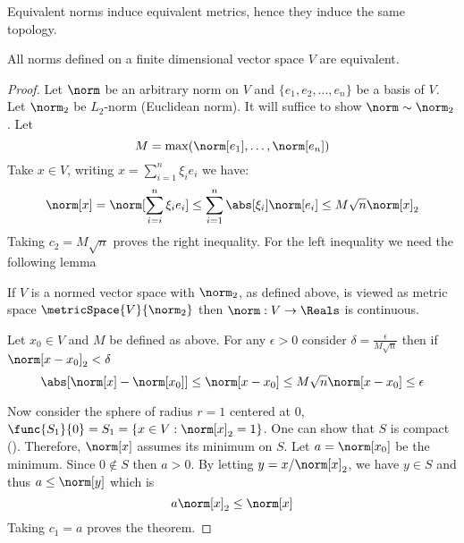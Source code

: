 \begin{remark}
    Equivalent norms induce equivalent metrics, hence they induce the same topology.
\end{remark}

\begin{theorem} \label{th:normsEquivalent}
    All norms defined on a finite dimensional vector space \(V\) are equivalent.
\end{theorem}

\begin{proof}
    Let \(\norm\) be an arbitrary norm on \(V\) and \(\{e_1, e_2, \dots , e_n\} \) be a basis of \(V\). Let \(\norm_2\) be \(L_2\)-norm (Euclidean norm). It will suffice to show \(\norm \sim \norm_2\). Let
    \begin{equation*}
        M = \max \! \left( \norm[e_1], \dots , \norm[e_n] \right)
    \end{equation*}
    Take \(x \in V\), writing \(x = \sum_{i = 1}^n {\xi_i e_i}\) we have:
    \begin{equation*}
        \norm[x] = \norm[\sum_{i = i}^n {\xi_i e_i}] \leq \sum_{i = 1}^n \abs[\xi_i] \norm[e_i] \leq M \sqrt{n} \norm[x]_2
    \end{equation*}
    Taking \(c_2 = M \sqrt{n}\) proves the right inequality. For the left inequality we need the following lemma
    \begin{lemma} \label{lm:ContinuityOfNorm}
        If \(V\) is a normed vector space with \(\norm_2\), as defined above, is viewed as metric space \(\metricSpace{V}{\norm_2}\) then \(\norm : V \to \Reals\) is continuous.
    \end{lemma}

    \begin{prooflemma}
        Let \(x_0 \in V\) and \(M\) be defined as above. For any \(\epsilon > 0\) consider \(\delta = \frac{\epsilon}{M \sqrt{n}}\) then if \(\norm[x - x_0]_2 < \delta\)
        \begin{equation*}
            \abs[{\norm[x] - \norm[x_0]}] \leq \norm[x - x_0] \leq M \sqrt{n} \norm[x - x_0] \leq \epsilon
        \end{equation*}
    \end{prooflemma}

    Now consider the sphere of radius \(r = 1\) centered at \(0\), \(\func{S_1}{0} = S_1 = \{x \in V : \norm[x]_2 = 1\}\). One can show that \(S\) is compact (). Therefore, \(\norm[x]\) assumes its minimum on \(S\). Let \( a = \norm[x_0]\) be the minimum. Since \(0 \notin S\) then \(a > 0\). By letting \(y = x / \norm[x]_2 \), we have \(y \in S\) and thus \(a \leq \norm[y]\) which is
    \begin{equation*}
        a \norm[x]_2 \leq \norm[x]
    \end{equation*}
    Taking \(c_1 = a\) proves the theorem.
\end{proof}

